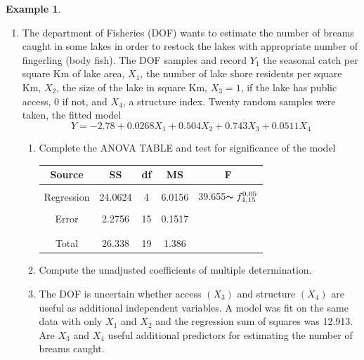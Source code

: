 \documentclass[11pt,a4paper]{article}
\theoremstyle{definition}
\newtheorem{exa}[thm]{Example}
\begin{document}
\begin{exa}
\begin{enumerate}
\item The department of Fisheries (DOF) wants to estimate the number of breams caught in some lakes in order to restock the lakes with appropriate number of fingerling (body fish). The DOF samples and record $Y_1$ the seasonal catch per square Km of lake area, $X_1$, the number of lake shore  residents per square Km, $X_2$, the size of the lake in square Km, $X_3=1$, if the lake has public access, 0 if not, and $X_4$, a structure index. Twenty random samples were taken, the fitted model $$Y=-2.78+0.0268X_1+0.504X_2+0.743X_3+0.0511X_4$$
\begin{enumerate}
     \item Complete the ANOVA TABLE and test for significance of the model
\begin{table}[H]
\centering
\begin{tabular}{|c|c|c|c|c|}
\hline
Source & SS & df & MS & F\\
\hline
&&&&\\
Regression & 24.0624 & 4 & 6.0156 & 39.655$\thicksim f_{4,15}^{0.05}$\\
&&&&\\
Error & 2.2756 & 15 & 0.1517 &\\
&&&&\\
\hline
&&&&\\
Total & 26.338 & 19 & 1.386 &\\
\hline
\end{tabular}
\end{table}


    \item Compute the unadjusted coefficients  of multiple determination.
    
    \item The DOF is uncertain whether access $(X_3)$ and structure $(X_4)$ are useful as additional independent variables. A model was fit on the same data with only $X_1$ and $X_2$ and the regression sum of squares was 12.913. Are $X_3$ and $X_4$ useful additional predictors for estimating the number of breams caught.\\
\end{enumerate}


\end{enumerate}
\end{exa}
\end{document}
